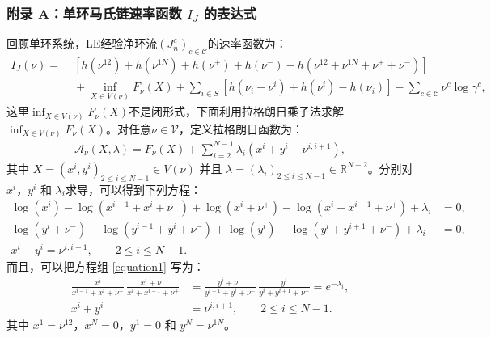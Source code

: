 \subsubsection{附录 A：单环马氏链速率函数 $I_J$ 的表达式 }{} \label{appendix:explicit}
回顾单环系统，LE经验净环流$(J_n^c)_{c \in \mathcal{C}}$的速率函数为：
\begin{equation*}\label{ratefunction2}
	\begin{split}
		I_J(\nu) =&\; \left[h\left(\nu^{12}\right)+h\left(\nu^{1N}\right)
		+h\left(\nu^+\right)+h\left(\nu^-\right)-h\left(\nu^{12}+\nu^{1N}+\nu^++\nu^-\right)\right] \\
		&\;+\inf_{X\in V(\nu)}F_{\nu}(X)+\sum_{i\in S}\left[ h\left(\nu_i-\nu^i\right)+h\left(\nu^i\right)
		-h\left(\nu_i\right)\right]-\sum_{c\in\mathcal{C}}\nu^c\log\gamma^c,
	\end{split}
\end{equation*}
这里$\inf_{X\in V(\nu)}F_{\nu}(X)$不是闭形式，下面利用拉格朗日乘子法求解$\inf_{X\in V(\nu)}F_{\nu}(X)$。对任意$\nu\in\mathcal{V}$，定义拉格朗日函数为：
\begin{align*}
    \mathcal{A}_{\nu}(X,\lambda) = F_{\nu}(X) + \sum_{i=2}^{N-1} \lambda_i \left(x^{i} + y^{i} - \nu^{i,i+1}\right),
\end{align*}
其中 $X=(x^i,y^i)_{2\le i\le N-1}\in V(\nu)$ 并且 $\lambda=(\lambda_i)_{2\le i\le N-1}\in \mathbb{R}^{N-2}$。分别对 $x^{i}$，$y^{i}$ 和 $\lambda_i$求导，可以得到下列方程：
\begin{equation}\label{equation1}
	\begin{split}
		\log\left(x^{i}\right) - \log\left(x^{i-1}+x^{i}+\nu^{+}\right)  + \log\left(x^{i}+\nu^{+}\right) -\log\left(x^{i}+x^{i+1}+\nu^{+}\right)+\lambda_i  &= 0, \\
		\log\left(y^{i}+\nu^{-}\right) -\log\left(y^{i-1}+y^{i}+\nu^{-}\right)  + \log\left(y^{i}\right) - \log\left(y^{i}+y^{i+1}+\nu^{-}\right) +\lambda_i &= 0, \\
		x^{i} + y^{i} = \nu^{i,i+1},\qquad 2\le i\le N-1.\qquad\qquad\qquad
	\end{split}
\end{equation}
而且，可以把方程组 \eqref{equation1} 写为：
\begin{equation}\label{equations}
    \begin{split}
    \frac{x^{i}}{x^{i-1}+x^{i}+\nu^+}
    \,\frac{x^{i}+\nu^+}{x^{i}+x^{i+1}+\nu^+}
    &= \frac{y^{i}+\nu^-}{y^{i-1}+y^{i}+\nu^-}
    \,\frac{y^{i}}{y^{i}+y^{i+1}+\nu^-}=e^{-\lambda_i},\\
    x^{i} + y^{i} &= \nu^{i,i+1},\qquad 2\le i\le N-1.
    \end{split}
\end{equation}
其中 $x^1=\nu^{12}$，$x^N=0$，$y^1=0$ 和 $y^N=\nu^{1N}$。

